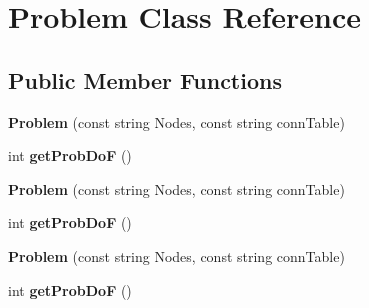 \hypertarget{class_problem}{
\section{Problem Class Reference}
\label{class_problem}
}
\subsection*{Public Member Functions}
\begin{DoxyCompactItemize}
\item 
\hypertarget{class_problem_a3cd966aed48d8f5d8c9c0fcead631f82}{
{\bfseries Problem} (const string Nodes, const string connTable)}
\label{class_problem_a3cd966aed48d8f5d8c9c0fcead631f82}

\item 
\hypertarget{class_problem_abc9fae5f96b6f1c3b573c365f7818770}{
int {\bfseries getProbDoF} ()}
\label{class_problem_abc9fae5f96b6f1c3b573c365f7818770}

\item 
\hypertarget{class_problem_a3cd966aed48d8f5d8c9c0fcead631f82}{
{\bfseries Problem} (const string Nodes, const string connTable)}
\label{class_problem_a3cd966aed48d8f5d8c9c0fcead631f82}

\item 
\hypertarget{class_problem_abc9fae5f96b6f1c3b573c365f7818770}{
int {\bfseries getProbDoF} ()}
\label{class_problem_abc9fae5f96b6f1c3b573c365f7818770}

\item 
\hypertarget{class_problem_a3cd966aed48d8f5d8c9c0fcead631f82}{
{\bfseries Problem} (const string Nodes, const string connTable)}
\label{class_problem_a3cd966aed48d8f5d8c9c0fcead631f82}

\item 
\hypertarget{class_problem_abc9fae5f96b6f1c3b573c365f7818770}{
int {\bfseries getProbDoF} ()}
\label{class_problem_abc9fae5f96b6f1c3b573c365f7818770}

\end{DoxyCompactItemize}
